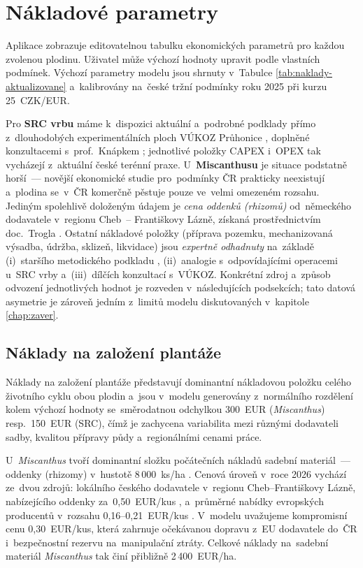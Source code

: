 \section{Nákladové parametry}
\label{sec:naklady}

Aplikace zobrazuje editovatelnou tabulku ekonomických parametrů pro
každou zvolenou plodinu. Uživatel může výchozí hodnoty upravit podle
vlastních podmínek. Výchozí parametry modelu jsou shrnuty v~Tabulce
\ref{tab:naklady-aktualizovane} a~kalibrovány na~české tržní podmínky
roku 2025 při kurzu 25~CZK/EUR.

Pro \textbf{SRC vrbu} máme k~dispozici aktuální a~podrobné podklady
přímo z~dlouhodobých experimentálních ploch VÚKOZ Průhonice
\citep{VUKOZ2026}, doplněné konzultacemi s~prof.~Knápkem
\citep{Knapek2026Komunikace}; jednotlivé položky CAPEX i~OPEX tak
vycházejí z~aktuální české terénní praxe.
U~\textbf{Miscanthusu} je situace podstatně horší~--- novější
ekonomické studie pro~podmínky ČR prakticky neexistují a~plodina
se~v~ČR komerčně pěstuje pouze ve~velmi omezeném rozsahu.
Jediným spolehlivě doloženým údajem je \textit{cena oddenků (rhizomů)}
od~německého dodavatele v~regionu Cheb~-- Františkovy Lázně, získaná
prostřednictvím doc.~Trogla \citep{Trogl2026}. Ostatní nákladové
položky (příprava pozemku, mechanizovaná výsadba, údržba, sklizeň,
likvidace) jsou \emph{expertně odhadnuty} na~základě (i)~staršího
metodického podkladu \citep{Strasil2009}, (ii)~analogie
s~odpovídajícími operacemi u~SRC vrby a~(iii)~dílčích konzultací
s~VÚKOZ. Konkrétní zdroj a~způsob odvození jednotlivých hodnot
je rozveden v~následujících podsekcích; tato datová asymetrie je
zároveň jedním z~limitů modelu diskutovaných v~kapitole
\ref{chap:zaver}.

\subsection*{Náklady na založení plantáže}

Náklady na založení plantáže představují dominantní nákladovou položku
celého životního cyklu obou plodin a~jsou v~modelu generovány
z~normálního rozdělení kolem výchozí hodnoty se~směrodatnou odchylkou
300~EUR (\textit{Miscanthus}) resp.~150~EUR (SRC), čímž je zachycena
variabilita mezi různými dodavateli sadby, kvalitou přípravy půdy
a~regionálními cenami práce.

U~\textit{Miscanthus} tvoří dominantní složku počátečních nákladů
sadební materiál~--- oddenky (rhizomy) v~hustotě 8\,000~ks/ha
\citep{Weger2021}. Cenová úroveň v~roce 2026 vychází ze~dvou zdrojů:
lokálního českého dodavatele v~regionu Cheb--Františkovy Lázně,
nabízejícího oddenky za~0,50~EUR/kus \citep{Trogl2026}, a~průměrné
nabídky evropských producentů v~rozsahu 0,16--0,21~EUR/kus
\citep{MiscanthusEU2026}. V~modelu uvažujeme kompromisní cenu
0,30~EUR/kus, která zahrnuje očekávanou dopravu z~EU dodavatele do~ČR
i~bezpečnostní rezervu na~manipulační ztráty. Celkové náklady
na~sadební materiál \textit{Miscanthus} tak činí přibližně 2\,400~EUR/ha.

